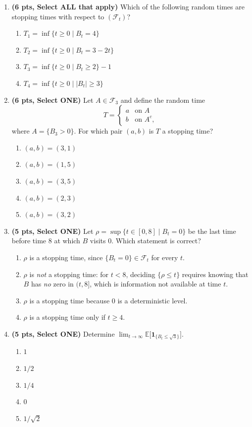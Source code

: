 \documentclass[11pt]{article}
\newcommand{\E}{\mathbb{E}}
\begin{document}
\begin{enumerate}

\item[\textbf{Q1.}] \textbf{(6 pts, Select ALL that apply)} Which of the following random times are stopping times with respect to $(\mathcal F_t)$?
\begin{enumerate}
  \item $T_1=\inf\{t\ge 0 \mid B_t=4\}$
  \item $T_2=\inf\{t\ge 0 \mid B_t=3-2t\}$
  \item $T_3=\inf\{t\ge 0 \mid B_t\ge 2\}-1$
  \item $T_4=\inf\{t\ge 0 \mid |B_t|\ge 3\}$
\end{enumerate}

\item[\textbf{Q2.}] \textbf{(6 pts, Select ONE)} Let $A\in\mathcal F_3$ and define the random time
\[
T=\begin{cases}a & \text{on } A\\ b & \text{on } A^c,\end{cases}
\]
where $A=\{B_3>0\}$. For which pair $(a,b)$ is $T$ a stopping time?
\begin{enumerate}
  \item $(a,b)=(3,1)$
  \item $(a,b)=(1,5)$
  \item $(a,b)=(3,5)$
  \item $(a,b)=(2,3)$
  \item $(a,b)=(3,2)$
\end{enumerate}

\item[\textbf{Q3.}] \textbf{(5 pts, Select ONE)} Let $\rho=\sup\{t\in[0,8]\mid B_t=0\}$ be the last time before time $8$ at which $B$ visits $0$. Which statement is correct?
\begin{enumerate}
  \item $\rho$ is a stopping time, since $\{B_t=0\}\in\mathcal F_t$ for every $t$.
  \item $\rho$ is \emph{not} a stopping time: for $t<8$, deciding $\{\rho\le t\}$ requires knowing that $B$ has \emph{no} zero in $(t,8]$, which is information not available at time $t$.
  \item $\rho$ is a stopping time because $0$ is a deterministic level.
  \item $\rho$ is a stopping time only if $t\ge 4$.
\end{enumerate}

\item[\textbf{Q4.}] \textbf{(5 pts, Select ONE)} Determine $\displaystyle\lim_{t\to\infty}\E\big[\mathbf 1_{\{B_t\le\sqrt3\}}\big]$.
\begin{enumerate}
  \item $1$
  \item $1/2$
  \item $1/4$
  \item $0$
  \item $1/\sqrt2$
\end{enumerate}


\end{enumerate}
\end{document}
